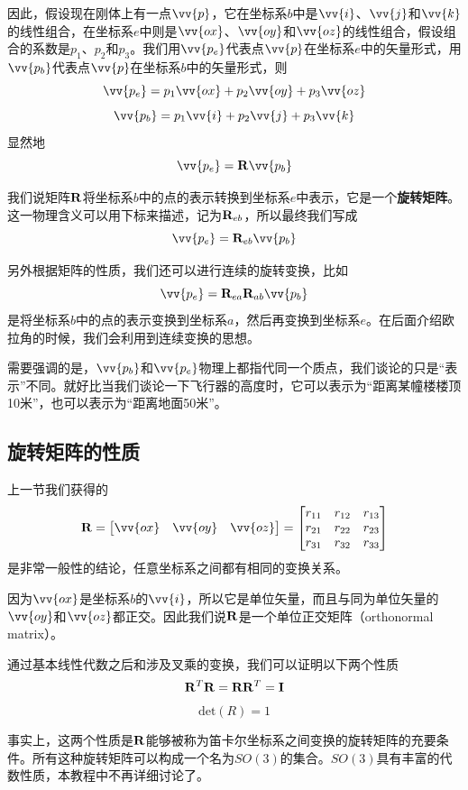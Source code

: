 \documentclass[11pt]{article}
\begin{document}
因此，假设现在刚体上有一点$\vv{p}$，它在坐标系$b$中是$\vv{i}$、$\vv{j}$和$\vv{k}$的线性组合，在坐标系$e$中则是$\vv{ox}$、$\vv{oy}$和$\vv{oz}$的线性组合，假设组合的系数是$p_1$、$p_2$和$p_3$。我们用$\vv{p_e}$代表点$\vv{p}$在坐标系$e$中的矢量形式，用$\vv{p_b}$代表点$\vv{p}$在坐标系$b$中的矢量形式，则
$$
\vv{p_e} = p_1\vv{ox}+p_2\vv{oy}+p_3\vv{oz}
$$
$$
\vv{p_b} = p_1\vv{i}+p_2\vv{j}+p_3\vv{k}
$$
显然地
$$
\vv{p_e} = {\bf R}\vv{p_b}
$$

我们说矩阵${\bf R}$将坐标系$b$中的点的表示转换到坐标系$e$中表示，它是一个\textbf{旋转矩阵}。这一物理含义可以用下标来描述，记为${\bf R}_{eb}$，所以最终我们写成
$$
\vv{p_e} = {\bf R}_{eb}\vv{p_b}
$$

另外根据矩阵的性质，我们还可以进行连续的旋转变换，比如
$$
\vv{p_e} = {\bf R}_{ea}{\bf R}_{ab}\vv{p_b}
$$
是将坐标系$b$中的点的表示变换到坐标系$a$，然后再变换到坐标系$e$。在后面介绍欧拉角的时候，我们会利用到连续变换的思想。

需要强调的是，$\vv{p_b}$和$\vv{p_e}$物理上都指代同一个质点，我们谈论的只是“表示”不同。就好比当我们谈论一下飞行器的高度时，它可以表示为“距离某幢楼楼顶10米”，也可以表示为“距离地面50米”。

\subsection{旋转矩阵的性质}\label{sec:rotationproperties}
上一节我们获得的
$$
{\bf R} = \begin{bmatrix}
\vv{ox} & \vv{oy} & \vv{oz}\\
\end{bmatrix}
= \begin{bmatrix}
r_{11} & r_{12} & r_{13}\\
r_{21} & r_{22} & r_{23}\\
r_{31} & r_{32} & r_{33}
\end{bmatrix}
$$
是非常一般性的结论，任意坐标系之间都有相同的变换关系。

因为$\vv{ox}$是坐标系$b$的$\vv{i}$，所以它是单位矢量，而且与同为单位矢量的$\vv{oy}$和$\vv{oz}$都正交。因此我们说${\bf R}$是一个单位正交矩阵（orthonormal matrix）。

通过基本线性代数之后和涉及叉乘的变换，我们可以证明以下两个性质
$$
{\bf R}^T{\bf R} = {\bf R}{\bf R}^T = \bf{I}
$$
$$
\text{det}(R) = 1
$$

事实上，这两个性质是${\bf R}$能够被称为笛卡尔坐标系之间变换的旋转矩阵的充要条件。所有这种旋转矩阵可以构成一个名为$SO(3)$的集合。$SO(3)$具有丰富的代数性质，本教程中不再详细讨论了。
\end{document}
